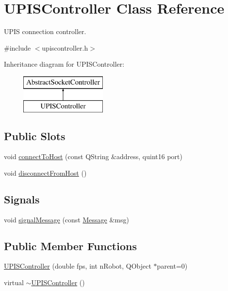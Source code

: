 \hypertarget{classUPISController}{
\section{UPISController Class Reference}
\label{classUPISController}
}


UPIS connection controller.  




{\ttfamily \#include $<$upiscontroller.h$>$}

Inheritance diagram for UPISController:\begin{figure}[H]
\begin{center}
\leavevmode
\includegraphics[height=2.000000cm]{classUPISController}
\end{center}
\end{figure}
\subsection*{Public Slots}
\begin{DoxyCompactItemize}
\item 
void \hyperlink{classUPISController_a78dcb22bf16cca05bebd9dd923c7ba28}{connectToHost} (const QString \&address, quint16 port)
\item 
void \hyperlink{classUPISController_a5d09ac4efcf74e202c905bf195f029dc}{disconnectFromHost} ()
\end{DoxyCompactItemize}
\subsection*{Signals}
\begin{DoxyCompactItemize}
\item 
void \hyperlink{classUPISController_a465e09e443e28302641ec092e285ae0a}{signalMessage} (const \hyperlink{classMessage}{Message} \&msg)
\end{DoxyCompactItemize}
\subsection*{Public Member Functions}
\begin{DoxyCompactItemize}
\item 
\hyperlink{classUPISController_a57d677d6dc0d2bbe68d93f24ec929e72}{UPISController} (double fps, int nRobot, QObject $\ast$parent=0)
\item 
virtual \hyperlink{classUPISController_a90625e6f59c386fd4b59c8652ab81977}{$\sim$UPISController} ()
\end{DoxyCompactItemize}
